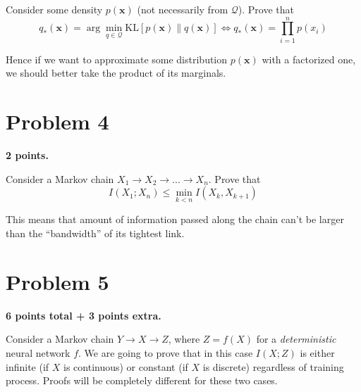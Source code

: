 \documentclass{article}
\begin{document}
Consider some density $p(\bm x)$ (not necessarily from $\mathcal{Q}$).
Prove that
\[
    q_*(\bm x) = \arg \min_{q \in \mathcal{Q}} \text{KL}[p(\bm x) \| q(\bm x)] \Longleftrightarrow q_*(\bm x) = \prod_{i=1}^n p(x_i)
\]

Hence if we want to approximate some distribution $p(\bm x)$ with a factorized one, we should better take the product of its marginals.

\section*{Problem 4}

\textbf{2 points.}

Consider a Markov chain $X_1 \to X_2 \to ... \to X_n$.
Prove that
\[
    I(X_1; X_n) \leq \min_{k<n} I(X_k, X_{k+1})
\]

This means that amount of information passed along the chain can't be larger than the ``bandwidth'' of its tightest link.

\section*{Problem 5}

\textbf{6 points total + 3 points extra.}

Consider a Markov chain $Y \to X \to Z$, where $Z = f(X)$ for a \textit{deterministic} neural network $f$.
We are going to prove that in this case $I(X;Z)$ is either infinite (if $X$ is continuous) or constant (if $X$ is discrete) regardless of training process.
Proofs will be completely different for these two cases.
\end{document}
